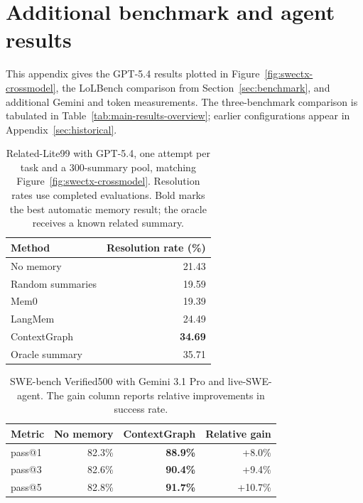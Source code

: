 \section{Additional benchmark and agent results}
\label{sec:new-results}
This appendix gives the GPT-5.4 results plotted in
Figure~\ref{fig:swectx-crossmodel}, the LoLBench comparison from
Section~\ref{sec:benchmark}, and additional Gemini and token measurements.
The three-benchmark comparison is tabulated in
Table~\ref{tab:main-results-overview}; earlier configurations appear in
Appendix~\ref{sec:historical}.

\begin{table}[htbp]
\centering
\caption{Related-Lite99 with GPT-5.4, one attempt per task and a
300-summary pool, matching Figure~\ref{fig:swectx-crossmodel}.
Resolution rates use completed evaluations. Bold marks the best automatic
memory result; the oracle receives a known related summary.}
\label{tab:new-swectx}
\begin{tabular}{lr}
\toprule
Method & Resolution rate (\%) \\
\midrule
No memory & 21.43 \\
Random summaries & 19.59 \\
Mem0 & 19.39 \\
LangMem & 24.49 \\
ContextGraph & \textbf{34.69} \\
\midrule
Oracle summary & 35.71 \\
\bottomrule
\end{tabular}
\end{table}

\begin{table}[htbp]
\centering
\caption{SWE-bench Verified500 with Gemini 3.1 Pro and live-SWE-agent.
The gain column reports relative improvements in success rate.}
\label{tab:new-gemini}
\begin{tabular}{lrrr}
\toprule
Metric & No memory & ContextGraph & Relative gain \\
\midrule
pass@1 & 82.3\% & \textbf{88.9\%} & +8.0\% \\
pass@3 & 82.6\% & \textbf{90.4\%} & +9.4\% \\
pass@5 & 82.8\% & \textbf{91.7\%} & +10.7\% \\
\bottomrule
\end{tabular}
\end{table}

